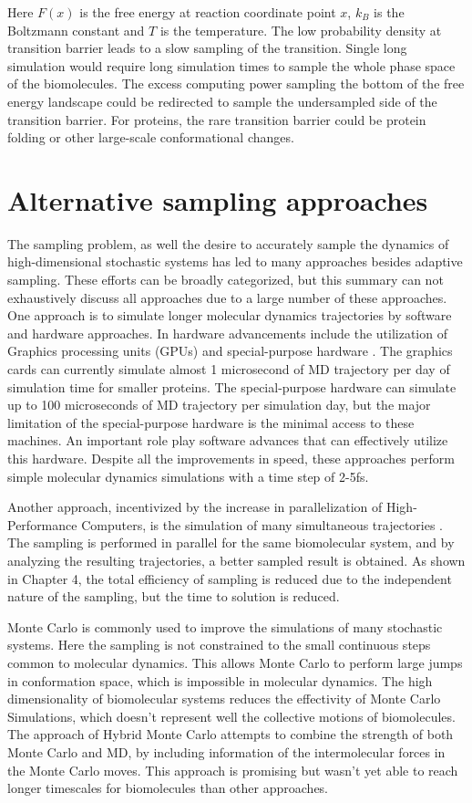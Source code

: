 Here $F(x)$ is the free energy at reaction coordinate point $x$, $k_{B}$ is the Boltzmann constant and $T$ is the temperature. The low probability density at transition barrier leads to a slow sampling of the transition. Single long simulation would require long simulation times to sample the whole phase space of the biomolecules. The excess computing power sampling the bottom of the free energy landscape could be redirected to sample the undersampled side of the transition barrier. For proteins, the rare transition barrier could be protein folding or other large-scale conformational changes.


\section{\label{sec:intro2}Alternative sampling approaches}

The sampling problem, as well the desire to accurately sample the dynamics of high-dimensional stochastic systems has led to many approaches besides adaptive sampling.
These efforts can be broadly categorized, but this summary can not exhaustively discuss all approaches due to a large number of these approaches.
One approach is to simulate longer molecular dynamics trajectories by software and hardware approaches. In hardware advancements include the utilization of Graphics processing units (GPUs) and special-purpose hardware \cite{shaw2014anton}. The graphics cards can currently simulate almost 1 microsecond of MD trajectory per day of simulation time for smaller proteins. The special-purpose hardware can simulate up to 100 microseconds of MD trajectory per simulation day, but the major limitation of the special-purpose hardware is the minimal access to these machines. An important role play software advances that can effectively utilize this hardware. Despite all the improvements in speed, these approaches perform simple molecular dynamics simulations with a time step of 2-5fs.

Another approach, incentivized by the increase in parallelization of High-Performance Computers, is the simulation of many simultaneous trajectories \cite{DistComp-Shirts2000, DistComp-Buch2010}. The sampling is performed in parallel for the same biomolecular system, and by analyzing the resulting trajectories, a better sampled result is obtained.  As shown in Chapter 4, the total efficiency of sampling is reduced due to the independent nature of the sampling, but the time to solution is reduced.

Monte Carlo is commonly used to improve the simulations of many stochastic systems. Here the sampling is not constrained to the small continuous steps common to molecular dynamics. This allows Monte Carlo to perform large jumps in conformation space, which is impossible in molecular dynamics. The high dimensionality of biomolecular systems reduces the effectivity of Monte Carlo Simulations, which doesn't represent well the collective motions of biomolecules. The approach of Hybrid Monte Carlo attempts to combine the strength of both Monte Carlo and MD, by including information of the intermolecular forces in the Monte Carlo moves. This approach is promising but wasn't yet able to reach longer timescales for biomolecules than other approaches. 


